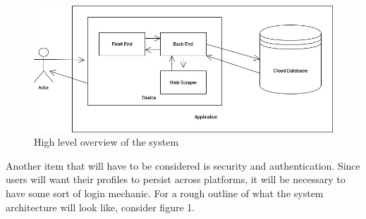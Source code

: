 \begin{figure}[h!]
	\centering
   	\includegraphics[width=1\textwidth]{project charter latex/images/system diagram.jpg}
   	\caption {High level overview of the system}
\end{figure}

Another item that will have to be considered is security and authentication.  Since users will want their profiles to persist across platforms, it will be necessary to have some sort of login mechanic.  
For a rough outline of what the system architecture will look like, consider figure 1.


